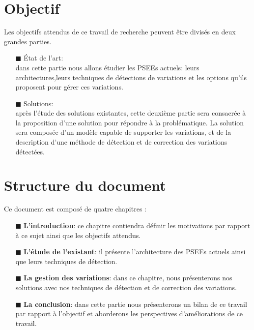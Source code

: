 \section{Objectif}
Les objectifs attendus de ce travail de recherche peuvent être divisés en deux grandes parties. \\
\begin{itemize}
\item[\tiny{$\blacksquare$}] État de l'art: \\
dans cette partie nous allons étudier les PSEEs actuels: leurs architectures,leurs techniques de détections de variations et les options qu'ils proposent pour gérer ces variations. \\
\item[\tiny{$\blacksquare$}] Solutions: \\
après l'étude des solutions existantes, cette deuxième partie sera consacrée à la proposition d'une solution pour répondre à la problématique. La solution sera composée d'un modèle capable de supporter les variations, et de la description d'une méthode de détection et de correction des variations détectées.
\end{itemize}
\section{Structure du document}
Ce document est composé de quatre chapitres :
\begin{enumerate}
\item[\tiny{$\blacksquare$}]\textbf{L'introduction}: ce chapitre contiendra définir les motivations  par rapport à ce sujet ainsi que les objectifs attendus. 
\item[\tiny{$\blacksquare$}]\textbf{L'étude de l'existant}: il présente l'architecture des PSEEs actuels ainsi que leurs techniques de détection.
\item[\tiny{$\blacksquare$}]\textbf{La gestion des variations}: dans ce chapitre, nous présenterons nos solutions avec nos techniques de détection et de correction des variations.
\item[\tiny{$\blacksquare$}]\textbf{La conclusion}: dans cette partie nous présenterons un bilan de ce travail par rapport à l'objectif et aborderons les perspectives d'améliorations de ce travail.
\end{enumerate}


